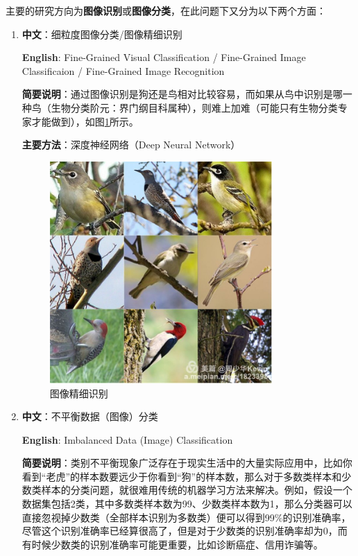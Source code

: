 \documentclass[14pt,a4paper]{extarticle}
\begin{document}
主要的研究方向为\textbf{图像识别}或\textbf{图像分类}，在此问题下又分为以下两个方面：
\begin{enumerate}
\item \textbf{中文}：细粒度图像分类/图像精细识别

\textbf{English}: Fine-Grained Visual Classification / Fine-Grained Image Classificaion / Fine-Grained Image Recognition

\textbf{简要说明}：通过图像识别是狗还是鸟相对比较容易，而如果从鸟中识别是哪一种鸟（生物分类阶元：界门纲目科属种），则难上加难（可能只有生物分类专家才能做到），如图\ref{fig:FGIR}所示。

\textbf{主要方法}：深度神经网络（Deep Neural Network）
\begin{figure}[!ht]
  \centering
  \includegraphics[width=0.8\textwidth]{FGIR.jpg}
  \caption{图像精细识别}
  \label{fig:FGIR} %
\end{figure}
\item \textbf{中文}：不平衡数据（图像）分类

\textbf{English}: Imbalanced Data (Image) Classification

\textbf{简要说明}：类别不平衡现象广泛存在于现实生活中的大量实际应用中，比如你看到“老虎”的样本数要远少于你看到“狗”的样本数，那么对于多数类样本和少数类样本的分类问题，就很难用传统的机器学习方法来解决。例如，假设一个数据集包括2类，其中多数类样本数为99、少数类样本数为1，那么分类器可以直接忽视掉少数类（全部样本识别为多数类）便可以得到99\%的识别准确率，尽管这个识别准确率已经算很高了，但是对于少数类的识别准确率却为0，而有时候少数类的识别准确率可能更重要，比如诊断癌症、信用诈骗等。


\end{enumerate}
\end{document}
